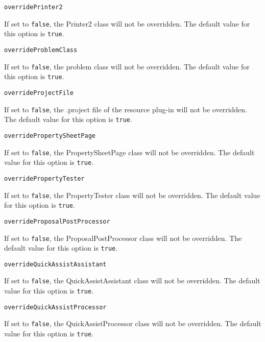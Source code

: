 \noindent\texttt{overridePrinter2}
\begin{myindentpar}{1cm}
If set to \texttt{false}, the Printer2 class will not be overridden. The default value for this option is \texttt{true}.
\end{myindentpar}

\noindent\texttt{overrideProblemClass}
\begin{myindentpar}{1cm}
If set to \texttt{false}, the problem class will not be overridden. The default value for this option is \texttt{true}.
\end{myindentpar}

\noindent\texttt{overrideProjectFile}
\begin{myindentpar}{1cm}
If set to \texttt{false}, the .project file of the resource plug-in will not be overridden. The default value for this option is \texttt{true}.
\end{myindentpar}

\noindent\texttt{overridePropertySheetPage}
\begin{myindentpar}{1cm}
If set to \texttt{false}, the PropertySheetPage class will not be overridden. The default value for this option is \texttt{true}.
\end{myindentpar}

\noindent\texttt{overridePropertyTester}
\begin{myindentpar}{1cm}
If set to \texttt{false}, the PropertyTester class will not be overridden. The default value for this option is \texttt{true}.
\end{myindentpar}

\noindent\texttt{overrideProposalPostProcessor}
\begin{myindentpar}{1cm}
If set to \texttt{false}, the ProposalPostProcessor class will not be overridden. The default value for this option is \texttt{true}.
\end{myindentpar}

\noindent\texttt{overrideQuickAssistAssistant}
\begin{myindentpar}{1cm}
If set to \texttt{false}, the QuickAssistAssistant class will not be overridden. The default value for this option is \texttt{true}.
\end{myindentpar}

\noindent\texttt{overrideQuickAssistProcessor}
\begin{myindentpar}{1cm}
If set to \texttt{false}, the QuickAssistProcessor class will not be overridden. The default value for this option is \texttt{true}.
\end{myindentpar}


